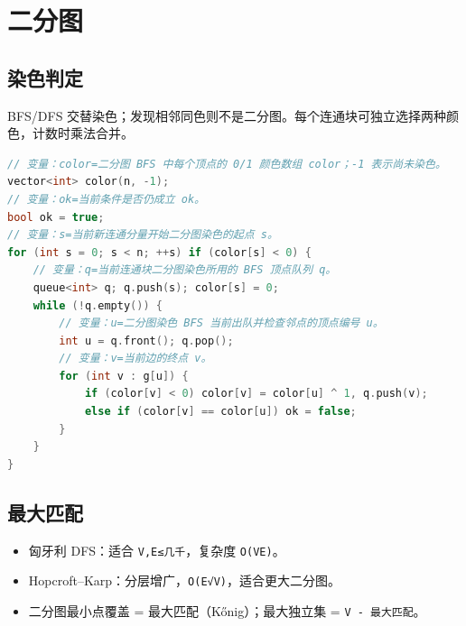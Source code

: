 \section{二分图}\label{ux4e8cux5206ux56fe}

\subsection{染色判定}\label{ux67d3ux8272ux5224ux5b9a}

BFS/DFS 交替染色；发现相邻同色则不是二分图。每个连通块可独立选择两种颜色，计数时乘法合并。

\begin{lstlisting}[language={C++}]
// 变量：color=二分图 BFS 中每个顶点的 0/1 颜色数组 color；-1 表示尚未染色。
vector<int> color(n, -1);
// 变量：ok=当前条件是否仍成立 ok。
bool ok = true;
// 变量：s=当前新连通分量开始二分图染色的起点 s。
for (int s = 0; s < n; ++s) if (color[s] < 0) {
    // 变量：q=当前连通块二分图染色所用的 BFS 顶点队列 q。
    queue<int> q; q.push(s); color[s] = 0;
    while (!q.empty()) {
        // 变量：u=二分图染色 BFS 当前出队并检查邻点的顶点编号 u。
        int u = q.front(); q.pop();
        // 变量：v=当前边的终点 v。
        for (int v : g[u]) {
            if (color[v] < 0) color[v] = color[u] ^ 1, q.push(v);
            else if (color[v] == color[u]) ok = false;
        }
    }
}
\end{lstlisting}

\subsection{最大匹配}\label{ux6700ux5927ux5339ux914d}

\begin{itemize}
\tightlist
\item
  匈牙利 DFS：适合 \passthrough{\lstinline!V,E≤几千!}，复杂度 \passthrough{\lstinline!O(VE)!}。
\item
  Hopcroft--Karp：分层增广，\passthrough{\lstinline!O(E√V)!}，适合更大二分图。
\item
  二分图最小点覆盖 = 最大匹配（Kőnig）；最大独立集 = \passthrough{\lstinline!V - 最大匹配!}。
\end{itemize}

